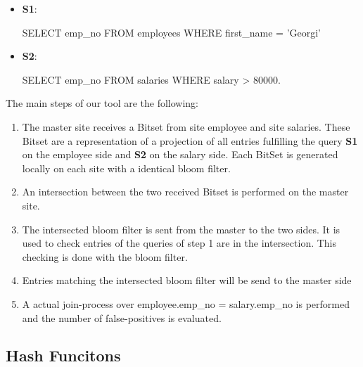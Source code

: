 \documentclass[12]{scrartcl}
\begin{document}
\begin{itemize}
	\item[]  \textbf{S1}: \begin{verb}
		SELECT emp_no FROM employees WHERE first_name = 'Georgi'
	\end{verb}
	\item[]  \textbf{S2}: \begin{verb}
		SELECT emp_no FROM salaries WHERE salary > 80000.
	\end{verb}
\end{itemize}


The main steps of our tool are the following:
\begin{enumerate}
	\item The master site receives a Bitset from site employee and site salaries. These Bitset are a representation of a projection of all entries fulfilling the query \textbf{S1} on the employee side and \textbf{S2} on the salary side. Each BitSet is generated locally on each site with a identical bloom filter.
	\item An intersection between the two received Bitset is performed on the master site.
	\item The intersected bloom filter is sent from the master to the two sides. It is used to check entries of the queries of step 1 are in the intersection. This checking is done with the bloom filter.
	\item Entries matching the intersected bloom filter will be send to the master side
	\item A actual join-process over employee.emp\_no = salary.emp\_no is performed and the number of false-positives is evaluated.
\end{enumerate}

\subsection{Hash Funcitons}
\end{document}
